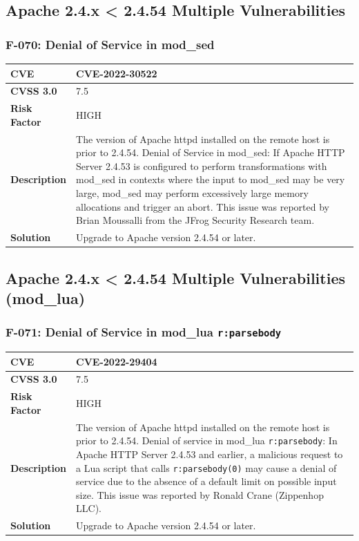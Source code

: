 %
%
\subsection{Apache 2.4.x < 2.4.54 Multiple Vulnerabilities}

\subsubsection{F-070: Denial of Service in mod\_sed}
\begin{tabular}{|p{2.8cm}|p{12.2cm}|}
\hline
\textbf{CVE} & CVE-2022-30522 \\ \hline
\textbf{CVSS 3.0} & 7.5 \\ \hline
\textbf{Risk Factor} & HIGH \\ \hline
\textbf{Description} & The version of Apache httpd installed on the remote host is prior to 2.4.54. Denial of Service in mod\_sed: If Apache HTTP Server 2.4.53 is configured to perform transformations with mod\_sed in contexts where the input to mod\_sed may be very large, mod\_sed may perform excessively large memory allocations and trigger an abort. This issue was reported by Brian Moussalli from the JFrog Security Research team. \\ \hline
\textbf{Solution} & Upgrade to Apache version 2.4.54 or later. \\ \hline
\end{tabular}

%
%
\subsection{Apache 2.4.x < 2.4.54 Multiple Vulnerabilities (mod\_lua)}

\subsubsection{F-071: Denial of Service in mod\_lua \texttt{r:parsebody}}
\begin{tabular}{|p{2.8cm}|p{12.2cm}|}
\hline
\textbf{CVE} & CVE-2022-29404 \\ \hline
\textbf{CVSS 3.0} & 7.5 \\ \hline
\textbf{Risk Factor} & HIGH \\ \hline
\textbf{Description} & The version of Apache httpd installed on the remote host is prior to 2.4.54. Denial of service in mod\_lua \texttt{r:parsebody}: In Apache HTTP Server 2.4.53 and earlier, a malicious request to a Lua script that calls \texttt{r:parsebody(0)} may cause a denial of service due to the absence of a default limit on possible input size. This issue was reported by Ronald Crane (Zippenhop LLC). \\ \hline
\textbf{Solution} & Upgrade to Apache version 2.4.54 or later. \\ \hline
\end{tabular}

